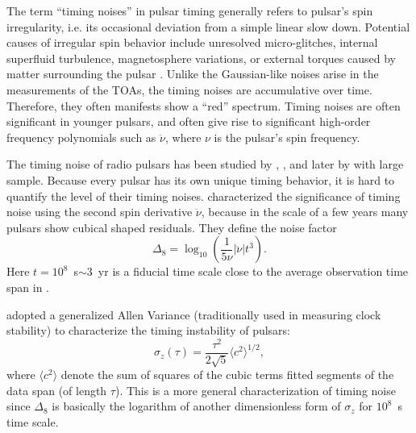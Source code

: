 The term ``timing noises'' in pulsar timing generally refers to pulsar's spin
irregularity, i.e. its occasional deviation from a simple linear slow down. 
Potential causes of irregular spin behavior include unresolved
micro-glitches, internal superfluid turbulence, magnetosphere variations, or external torques caused by matter surrounding the pulsar
\citep{hlk10, ymh+13, ml14}.
Unlike the Gaussian-like noises arise in the measurements of the TOAs, the
timing noises
are accumulative over time. Therefore, they often manifests show a ``red'' 
spectrum. Timing noises are often significant in younger pulsars, and often
give rise to significant high-order frequency polynomials such as
$\ddot{\nu}$, where $\nu$ is the pulsar's spin frequency.

The timing noise of radio pulsars has been studied by \citet{antt94},
\citet{dmhd95}, \citet{mtem97} and later by \citet{hlk10} with large sample. 
Because every pulsar has its own unique timing behavior, it is
hard to quantify the level of their timing noises.
\citet{antt94} characterized the significance of timing noise using the second
spin derivative $\ddot{\nu}$, because in the scale of a few years many
pulsars show cubical shaped residuals. They define the noise factor 
\begin{equation}
\label{eq:delta8}
\Delta_8 = \log_{10}\left(\frac{1}{5\nu}|\ddot{\nu}|t^3\right).
\end{equation}
Here $t=10^8$~s$\sim 3$~yr is a fiducial time scale close to the average observation time span in \citet{antt94}.

\citet{mtem97} adopted a generalized Allen Variance (traditionally used in
measuring clock stability) to characterize the timing instability of pulsars:
\begin{equation}
\label{eq:sigmaz}
\sigma_z(\tau) = \frac{\tau^2}{2\sqrt{5}}\langle c^2 \rangle^{1/2},
\end{equation}
where $\langle c^2\rangle$ denote the sum of squares of the cubic terms fitted segments of
the data span (of length $\tau$).
This is a more general characterization of timing noise since $\Delta_8$ is
basically the logarithm of another dimensionless form of $\sigma_z$ for
$10^8$~s time scale.

